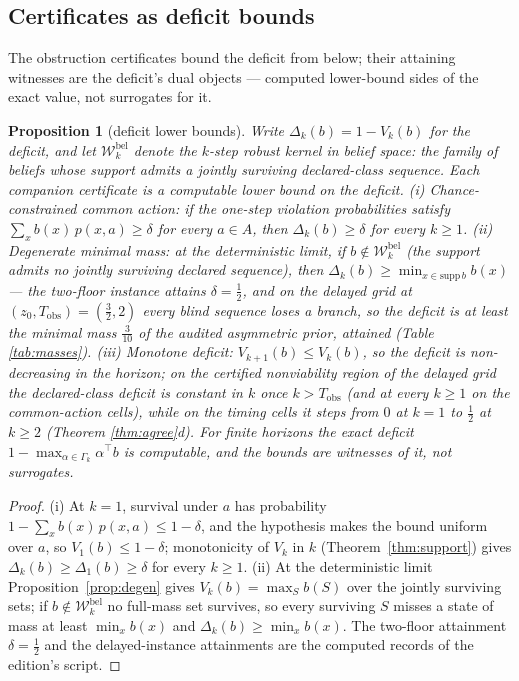 \documentclass[10pt,twocolumn]{article}
\theoremstyle{plain}
\newtheorem{proposition}[theorem]{Proposition}
\theoremstyle{definition}
\theoremstyle{remark}
\begin{document}
\subsection{Certificates as deficit bounds}\label{deficit}

The obstruction certificates bound the deficit from below; their attaining
witnesses are the deficit's dual objects --- computed lower-bound sides of
the exact value, not surrogates for it.

\begin{proposition}[deficit lower bounds]\label{prop:deficit}
Write \(\Delta_{k}(b) = 1 - V_{k}(b)\) for the deficit, and let
\(\mathcal{W}^{\mathrm{bel}}_{k}\)
denote the \(k\)-step robust kernel in belief space: the family of beliefs
whose support admits a jointly surviving declared-class sequence. Each
companion certificate is a computable lower bound on the deficit.
(i) \emph{Chance-constrained common action:} if the one-step violation
probabilities satisfy \(\sum_{x} b(x)\, p(x, a) \ge \delta\) for every
\(a \in A\), then \(\Delta_{k}(b) \ge \delta\) for every \(k \ge 1\).
(ii) \emph{Degenerate minimal mass:} at the deterministic limit, if
\(b \notin \mathcal{W}^{\mathrm{bel}}_{k}\) (the support admits no jointly surviving declared
sequence), then \(\Delta_{k}(b) \ge \min_{x \in \mathrm{supp}\, b} b(x)\)
--- the two-floor instance attains \(\delta = \tfrac{1}{2}\), and on the
delayed grid at \((z_{0}, T_{\mathrm{obs}}) = (\tfrac{3}{2}, 2)\) every
blind sequence loses a branch, so the deficit is at least the minimal
mass \(\tfrac{3}{10}\) of the audited asymmetric prior, attained
(Table \ref{tab:masses}).
(iii) \emph{Monotone deficit:} \(V_{k+1}(b) \le V_{k}(b)\), so the
deficit is non-decreasing in the horizon; on the certified nonviability
region of the delayed grid the declared-class deficit is constant in
\(k\) once \(k > T_{\mathrm{obs}}\) (and at every \(k \ge 1\) on
the common-action cells), while on the timing cells it steps from
\(0\) at \(k = 1\) to \(\tfrac{1}{2}\) at \(k \ge 2\) (Theorem
\ref{thm:agree}d).
For finite horizons the exact deficit
\(1 - \max_{\alpha \in \Gamma_{k}} \alpha^{\top} b\) is computable, and
the bounds are witnesses of it, not surrogates.
\end{proposition}

\begin{proof}
(i) At \(k = 1\), survival under \(a\) has probability
\(1 - \sum_{x} b(x)\, p(x, a) \le 1 - \delta\), and the hypothesis
makes the bound uniform over \(a\), so \(V_{1}(b) \le 1 - \delta\);
monotonicity of \(V_{k}\) in \(k\) (Theorem~\ref{thm:support}) gives
\(\Delta_{k}(b) \ge \Delta_{1}(b) \ge \delta\) for every
\(k \ge 1\). (ii) At the deterministic limit
Proposition~\ref{prop:degen} gives \(V_{k}(b) = \max_{S} b(S)\) over
the jointly surviving sets; if
\(b \notin \mathcal{W}^{\mathrm{bel}}_{k}\) no full-mass set
survives, so every surviving \(S\) misses a state of mass at least
\(\min_{x} b(x)\) and \(\Delta_{k}(b) \ge \min_{x} b(x)\). The
two-floor attainment \(\delta = \tfrac12\) and the delayed-instance
attainments are the computed records of the edition's script.
\end{proof}
\end{document}
